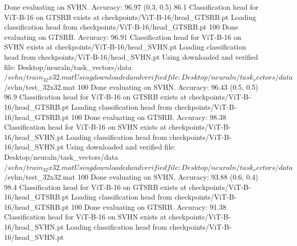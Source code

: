 Done evaluating on SVHN. Accuracy: 96.97%
  (0.3, 0.5)        86.1%
Classification head for ViT-B-16 on GTSRB exists at checkpoints/ViT-B-16/head_GTSRB.pt
Loading classification head from checkpoints/ViT-B-16/head_GTSRB.pt
100%
Done evaluating on GTSRB. Accuracy: 96.91%
Classification head for ViT-B-16 on SVHN exists at checkpoints/ViT-B-16/head_SVHN.pt
Loading classification head from checkpoints/ViT-B-16/head_SVHN.pt
Using downloaded and verified file: Desktop/neuraln/task_vectors/data$/svhn/train_32x32.mat
Using downloaded and verified file: Desktop/neuraln/task_vectors/data$/svhn/test_32x32.mat
100%
Done evaluating on SVHN. Accuracy: 96.43%
  (0.5, 0.5)        96.9%
Classification head for ViT-B-16 on GTSRB exists at checkpoints/ViT-B-16/head_GTSRB.pt
Loading classification head from checkpoints/ViT-B-16/head_GTSRB.pt
100%
Done evaluating on GTSRB. Accuracy: 98.38%
Classification head for ViT-B-16 on SVHN exists at checkpoints/ViT-B-16/head_SVHN.pt
Loading classification head from checkpoints/ViT-B-16/head_SVHN.pt
Using downloaded and verified file: Desktop/neuraln/task_vectors/data$/svhn/train_32x32.mat
Using downloaded and verified file: Desktop/neuraln/task_vectors/data$/svhn/test_32x32.mat
100%
Done evaluating on SVHN. Accuracy: 93.88%
  (0.6, 0.4)        98.4%
Classification head for ViT-B-16 on GTSRB exists at checkpoints/ViT-B-16/head_GTSRB.pt
Loading classification head from checkpoints/ViT-B-16/head_GTSRB.pt
100%
Done evaluating on GTSRB. Accuracy: 91.38%
Classification head for ViT-B-16 on SVHN exists at checkpoints/ViT-B-16/head_SVHN.pt
Loading classification head from checkpoints/ViT-B-16/head_SVHN.pt
